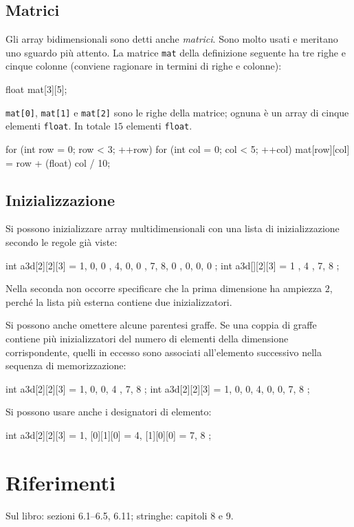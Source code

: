 \documentclass[11pt,a4paper]{article}
\begin{document}
\subsection{Matrici}

Gli array bidimensionali sono detti anche \emph{matrici}. Sono molto usati e meritano uno sguardo più attento. La matrice \lstinline|mat| della definizione seguente ha tre righe e cinque colonne (conviene ragionare in termini di righe e colonne):
\begin{codice}
float mat[3][5];
\end{codice}
\lstinline|mat[0]|, \lstinline|mat[1]| e \lstinline|mat[2]| sono le righe della matrice; ognuna è un array di cinque elementi \lstinline|float|. In totale $15$ elementi \lstinline|float|.
\begin{codice}
for (int row = 0; row < 3; ++row)
    for (int col = 0; col < 5; ++col)
        mat[row][col] = row + (float) col / 10;
\end{codice}

\subsection{Inizializzazione}

Si possono inizializzare array multidimensionali con una lista di inizializzazione secondo le regole già viste:
\begin{codice}
int a3d[2][2][3] = { { { 1, 0, 0 }, { 4, 0, 0 } }, { { 7, 8, 0 }, { 0, 0, 0 } } };
int a3d[][2][3]  = { { { 1 }, { 4 } }, { { 7, 8 } } };
\end{codice}
Nella seconda non occorre specificare che la prima dimensione ha ampiezza $2$, perché la lista più esterna contiene due inizializzatori.

Si possono anche omettere alcune parentesi graffe. Se una coppia di graffe contiene più inizializzatori del numero di elementi della dimensione corrispondente, quelli in eccesso sono associati all'elemento successivo nella sequenza di memorizzazione:
\begin{codice}
int a3d[2][2][3] = { { 1, 0, 0, 4 }, { 7, 8 } };
int a3d[2][2][3] = { 1, 0, 0, 4, 0, 0, 7, 8 };
\end{codice}
Si possono usare anche i designatori di elemento:
\begin{codice}
int a3d[2][2][3] = { 1, [0][1][0] = 4, [1][0][0] = 7, 8 };
\end{codice}

\section{Riferimenti}

Sul libro: sezioni 6.1--6.5, 6.11; stringhe: capitoli 8 e 9.
\end{document}
